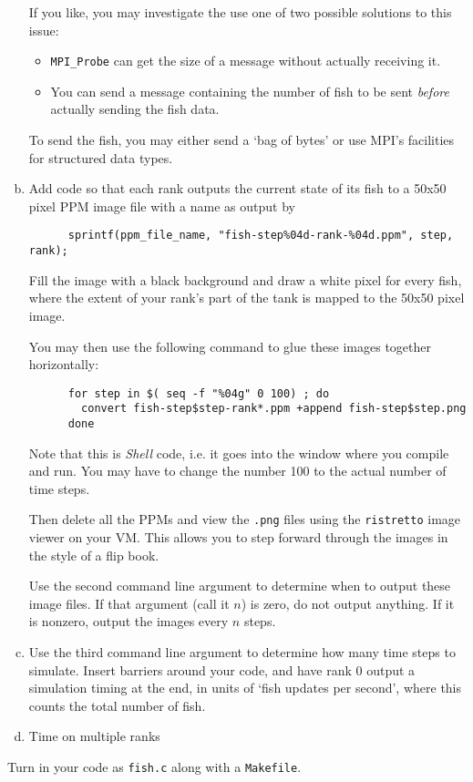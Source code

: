 \documentclass[11pt]{article}
\begin{document}
\begin{enumerate}[a)]
    If you like, you may investigate the use one of two possible
    solutions to this issue:
    \begin{itemize}
      \item \texttt{MPI\_Probe} can get the size of a message without
        actually receiving it.
      \item You can send a message containing the number of fish to be
        sent \emph{before} actually sending the fish data.
    \end{itemize}
    To send the fish, you may either send a `bag of bytes' or use
    MPI's facilities for structured data types.

  \item Add code so that each rank outputs the current state of its
    fish to a 50x50 pixel PPM image file with a name as output by
    \begin{lstlisting}
      sprintf(ppm_file_name, "fish-step%04d-rank-%04d.ppm", step, rank);
    \end{lstlisting}
    Fill the image with a black background and draw a white pixel for
    every fish, where the extent of your rank's part of the tank is
    mapped to the 50x50 pixel image.

    You may then use the following command to glue these images
    together horizontally:
    \begin{lstlisting}
      for step in $( seq -f "%04g" 0 100) ; do
        convert fish-step$step-rank*.ppm +append fish-step$step.png
      done
    \end{lstlisting}%
    Note that this is \emph{Shell} code, i.e. it goes into the window
    where you compile and run.  You may have to change the number 100
    to the actual number of time steps.

    Then delete all the PPMs and view the \texttt{.png} files using
    the \texttt{ristretto} image viewer on your VM. This allows you to
    step forward through the images in the style of a flip book.

    Use the second command line argument to determine when to output
    these image files. If that argument (call it $n$) is zero, do not
    output anything.  If it is nonzero, output the images every $n$
    steps.

  \item Use the third command line argument to determine how many time
    steps to simulate. Insert barriers around your code, and have 
    rank 0 output a simulation timing at the end, in units of `fish
    updates per second', where this counts the total number of fish.

  \item %
    Time on multiple ranks
\end{enumerate}
Turn in your code as \texttt{fish.c} along with a \texttt{Makefile}.
\end{document}

